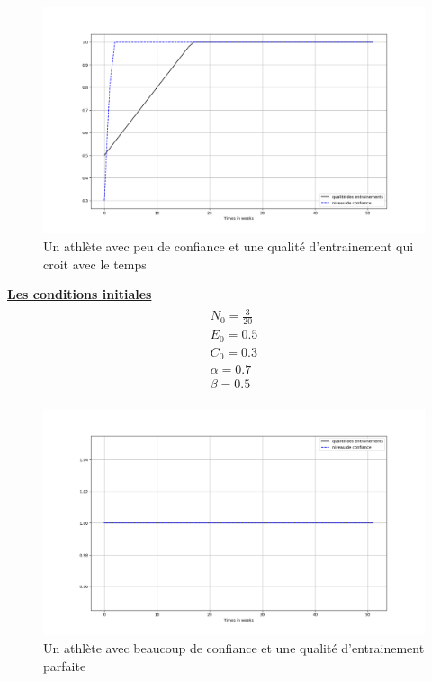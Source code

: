 \documentclass[
]{article}
\begin{document}
		\begin{figure}[H]
			\centering
			\includegraphics[width=\textwidth]{Graph2SImu1}
			\caption{Un athlète avec peu de confiance et une qualité d'entrainement qui croit avec le temps}
			\label{fig:fig1_3}
		\end{figure}
		
		\underline{\textbf{Les conditions initiales}}
		\begin{align*}
			\boxed{\begin{array}{c} N_0=\frac{3}{20} \\ E_0=0.5 \\
					C_0=0.3 \\
					\alpha=0.7 \\
					\beta=0.5
			\end{array}}
		\end{align*}
		
		\begin{figure}[H]
			\centering
			\includegraphics[width=\textwidth]{Graph3SImu1}
			\caption{Un athlète avec beaucoup de confiance et une qualité d'entrainement parfaite}
			\label{fig:1_3}
		\end{figure}
		
\end{document}
